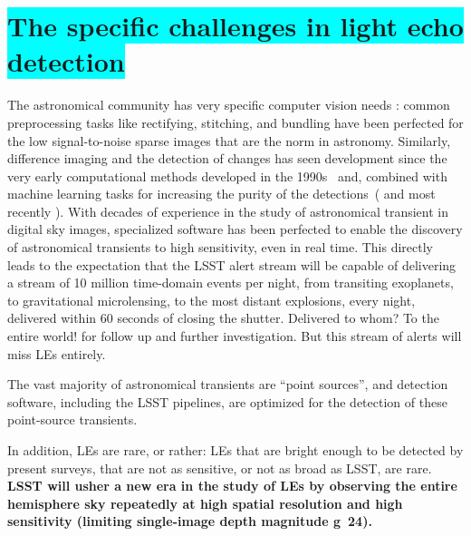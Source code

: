 \documentclass{proposalnsf}
\newcommand{\armin}[1]{\colorbox{cyan}{#1}}
\begin{document}
\section{\armin{The specific challenges in light echo detection}}


The astronomical community has very specific computer vision needs : common preprocessing tasks like rectifying, stitching, and bundling have been perfected for the low signal-to-noise sparse images that are the norm in astronomy.  Similarly, difference imaging and the detection of changes has seen development since the very early computational methods developed in the 1990s~\citep{alardlupton99} and, combined with machine learning tasks for increasing the purity of the detections~(\citealt{wozniak13} and most recently \citealt{duev19}).  With decades of experience in the study of astronomical transient in digital sky images, specialized software has been perfected to enable the discovery of astronomical transients to high sensitivity, even in real time.  This directly leads to the expectation that the LSST alert stream will be capable of delivering a stream of 10 million time-domain events per night, from transiting exoplanets, to gravitational microlensing, to the most distant explosions, every night, delivered within 60 seconds of closing the shutter.  Delivered to whom? To the entire world! for follow up and further investigation.  But this stream of alerts will miss LEs entirely.

The vast majority of astronomical transients are “point sources”, and detection software, including the LSST pipelines, are optimized for the detection of these point-source transients.



In addition, LEs are rare, or rather: LEs that are bright enough to be detected by present surveys, that are not as sensitive, or not as broad as LSST, are rare.  
{\bf LSST will usher a new era in the study of LEs by observing the entire hemisphere sky repeatedly at high spatial resolution and high sensitivity (limiting single-image depth magnitude g~24).  }
\end{document}
